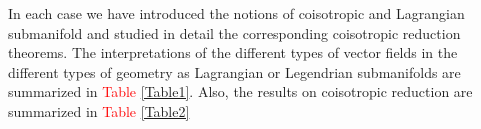 \documentclass[12pt]{article}
\begin{document}
In each case we have introduced the notions of coisotropic and Lagrangian submanifold and studied in detail the corresponding coisotropic reduction theorems. The interpretations of the different types of vector fields in the different types of geometry as Lagrangian or Legendrian submanifolds are summarized in \textcolor{red}{Table \ref{Table1}}. Also, the results on coisotropic reduction are summarized in \textcolor{red}{Table \ref{Table2}}

\begin{table}[ht]
\centering
\caption{\small \textbf{Interpretation of vector fields as Lagrangian or Legendrian submanifolds}}
\rule{0pt}{4ex}  
\end{table}
\end{document}
